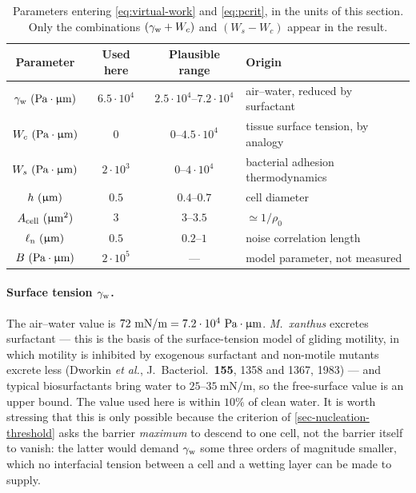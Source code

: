 \documentclass[a5paper]{article}
\begin{document}
\begin{table}[h!]
    \centering
    \begin{tabular}{c|c|c|l}
        \hline
        Parameter & Used here & Plausible range & Origin \\
        \hline
        $\gamma_{\rm w}~(\text{Pa}\cdot\upmu\mathrm{m})$ & $6.5\cdot10^{4}$ & $2.5\cdot10^{4}$--$7.2\cdot10^{4}$ & air--water, reduced by surfactant \\
        $W_c~(\text{Pa}\cdot\upmu\mathrm{m})$ & $0$ & $0$--$4.5\cdot10^{4}$ & tissue surface tension, by analogy \\
        $W_s~(\text{Pa}\cdot\upmu\mathrm{m})$ & $2\cdot10^{3}$ & $0$--$4\cdot10^{4}$ & bacterial adhesion thermodynamics \\
        $h~(\upmu\mathrm{m})$ & $0.5$ & $0.4$--$0.7$ & cell diameter \\
        $A_{\text{cell}}~(\upmu\mathrm{m}^2)$ & $3$ & $3$--$3.5$ & $\simeq1/\rho_0$ \\
        $\ell_{\rm n}~(\upmu\mathrm{m})$ & $0.5$ & $0.2$--$1$ & noise correlation length \\
        $B~(\text{Pa}\cdot\upmu\mathrm{m})$ & $2\cdot10^{5}$ & --- & model parameter, not measured \\
        \hline
    \end{tabular}
    \caption{Parameters entering \eqref{eq:virtual-work} and \eqref{eq:pcrit}, in the units of this section. Only the combinations $(\gamma_{\rm w}+W_c)$ and $(W_s-W_c)$ appear in the result.}
    \label{tab:extrusion-parameters}
\end{table}

\paragraph{Surface tension $\gamma_{\rm w}$.} The air--water value is $72~\mathrm{mN/m} = 7.2\cdot10^{4}~\text{Pa}\cdot\upmu\mathrm{m}$. \emph{M.\ xanthus} excretes surfactant --- this is the basis of the surface-tension model of gliding motility, in which motility is inhibited by exogenous surfactant and non-motile mutants excrete less (Dworkin \emph{et al.}, J.\ Bacteriol.\ \textbf{155}, 1358 and 1367, 1983) --- and typical biosurfactants bring water to $25$--$35~\mathrm{mN/m}$, so the free-surface value is an upper bound. The value used here is within $10\%$ of clean water. It is worth stressing that this is only possible because the criterion of \cref{sec-nucleation-threshold} asks the barrier \emph{maximum} to descend to one cell, not the barrier itself to vanish: the latter would demand $\gamma_{\rm w}$ some three orders of magnitude smaller, which no interfacial tension between a cell and a wetting layer can be made to supply.
\end{document}
